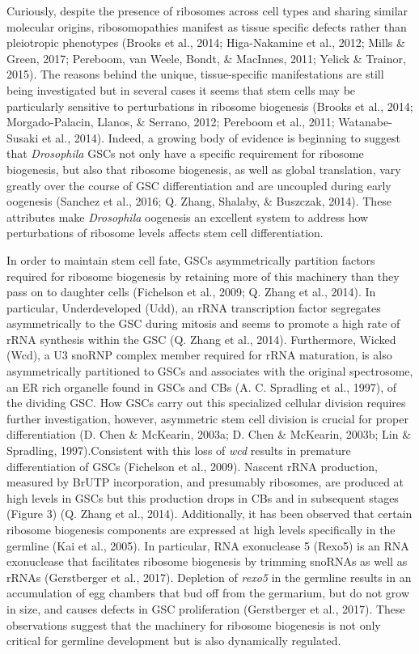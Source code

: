 \documentclass[12pt,oneside]{reedthesis}
\begin{document}
Curiously, despite the presence of ribosomes across cell types and
sharing similar molecular origins, ribosomopathies manifest as tissue
specific defects rather than pleiotropic phenotypes (Brooks et al., 2014; Higa-Nakamine et al., 2012; Mills \& Green, 2017; Pereboom, van Weele, Bondt, \& MacInnes, 2011; Yelick \& Trainor, 2015).
The reasons behind the unique, tissue-specific manifestations are still
being investigated but in several cases it seems that stem cells may be
particularly sensitive to perturbations in ribosome biogenesis
(Brooks et al., 2014; Morgado-Palacin, Llanos, \& Serrano, 2012; Pereboom et al., 2011; Watanabe-Susaki et al., 2014). Indeed, a growing body of evidence is beginning
to suggest that \emph{Drosophila} GSCs not only have a specific requirement
for ribosome biogenesis, but also that ribosome biogenesis, as well as
global translation, vary greatly over the course of GSC differentiation
and are uncoupled during early oogenesis (Sanchez et al., 2016; Q. Zhang, Shalaby, \& Buszczak, 2014). These attributes make \emph{Drosophila} oogenesis an
excellent system to address how perturbations of ribosome levels affects
stem cell differentiation.

In order to maintain stem cell fate, GSCs asymmetrically partition
factors required for ribosome biogenesis by retaining more of this
machinery than they pass on to daughter cells (Fichelson et al., 2009; Q. Zhang et al., 2014). In particular, Underdeveloped (Udd), an rRNA
transcription factor segregates asymmetrically to the GSC during mitosis
and seems to promote a high rate of rRNA synthesis within the GSC
(Q. Zhang et al., 2014). Furthermore, Wicked (Wcd), a U3 snoRNP complex member
required for rRNA maturation, is also asymmetrically partitioned to GSCs
and associates with the original spectrosome, an ER rich organelle found
in GSCs and CBs (A. C. Spradling et al., 1997), of the dividing GSC. How GSCs
carry out this specialized cellular division requires further
investigation, however, asymmetric stem cell division is crucial for
proper differentiation (D. Chen \& McKearin, 2003a; D. Chen \& McKearin, 2003b; Lin \& Spradling, 1997).Consistent with this loss of \emph{wcd} results in premature
differentiation of GSCs (Fichelson et al., 2009). Nascent rRNA production,
measured by BrUTP incorporation, and presumably ribosomes, are produced
at high levels in GSCs but this production drops in CBs and in
subsequent stages (Figure 3) (Q. Zhang et al., 2014). Additionally, it has been
observed that certain ribosome biogenesis components are expressed at
high levels specifically in the germline (Kai et al., 2005). In particular,
RNA exonuclease 5 (Rexo5) is an RNA exonuclease that facilitates
ribosome biogenesis by trimming snoRNAs as well as rRNAs
(Gerstberger et al., 2017). Depletion of \emph{rexo5} in the germline results in
an accumulation of egg chambers that bud off from the germarium, but do
not grow in size, and causes defects in GSC proliferation
(Gerstberger et al., 2017). These observations suggest that the machinery for
ribosome biogenesis is not only critical for germline development but is
also dynamically regulated.
\end{document}
